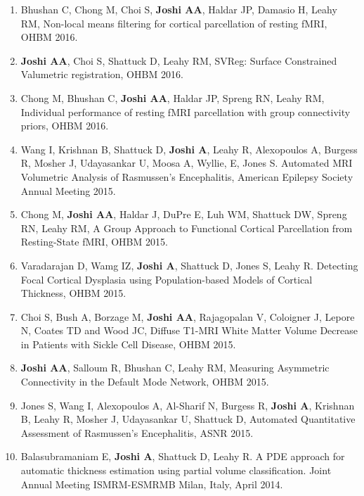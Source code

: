 \documentclass[overlapped,line,letterpaper]{res}
\begin{document}
\begin{resume}
\begin{enumerate}
     \item Bhushan C, Chong M, Choi S, \textbf{Joshi AA}, Haldar JP, Damasio H, Leahy RM, {Non-local means filtering for cortical parcellation of resting fMRI}, OHBM 2016.
     
     \item \textbf{Joshi AA}, Choi S, Shattuck D, Leahy RM, {SVReg: Surface Constrained Valumetric registration}, OHBM 2016.

    \item Chong M, Bhushan C, \textbf{Joshi AA}, Haldar JP, Spreng RN, Leahy RM, {Individual performance of resting fMRI parcellation with group connectivity priors}, OHBM 2016.
    
    \item Wang I, Krishnan B, Shattuck D, \textbf{Joshi A}, Leahy R, Alexopoulos A, Burgess R, Mosher J, Udayasankar U, Moosa A, Wyllie, E, Jones S. {Automated MRI Volumetric Analysis of Rasmussen's Encephalitis}, American Epilepsy Society Annual Meeting 2015.

    \item Chong M, \textbf{Joshi AA}, Haldar J, DuPre E, Luh WM, Shattuck DW, Spreng RN, Leahy RM, {A Group Approach to Functional Cortical Parcellation from Resting-State fMRI}, OHBM 2015.

    \item Varadarajan D, Wamg IZ, \textbf{Joshi A}, Shattuck D, Jones S, Leahy R. {Detecting Focal Cortical Dysplasia using Population-based Models of Cortical Thickness},  OHBM 2015.

    \item Choi S, Bush A, Borzage M, \textbf{Joshi AA}, Rajagopalan V, Coloigner J, Lepore N, Coates TD and Wood JC, {Diffuse T1-MRI White Matter Volume Decrease in Patients with Sickle Cell Disease}, OHBM 2015.

    \item \textbf{Joshi AA}, Salloum R, Bhushan C, Leahy RM, {Measuring Asymmetric Connectivity in the Default Mode Network}, OHBM 2015.

    \item Jones S, Wang I, Alexopoulos A, Al-Sharif N, Burgess R, \textbf{Joshi A}, Krishnan B, Leahy R, Mosher J, Udayasankar U, Shattuck D, {Automated Quantitative Assessment of Rasmussen's Encephalitis}, ASNR 2015.
    
    \item Balasubramaniam E, \textbf{Joshi A}, Shattuck D, Leahy R. A PDE approach for automatic thickness estimation using partial volume classification. Joint Annual Meeting ISMRM-ESMRMB Milan, Italy, April 2014.


\end{enumerate}
\end{resume}
\end{document}
